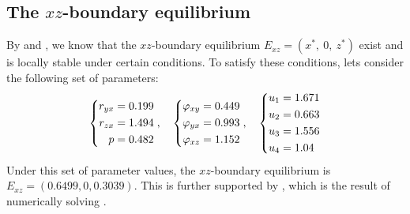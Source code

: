 \subsection{The $xz$-boundary equilibrium}\label{subsec:numsim_xz_boundary_equilibrium}
By  and , we know that the $xz$-boundary equilibrium $E_{xz}=\left(x^*,\ 0,\ z^*\right)$ exist and is locally stable under certain conditions. To satisfy these conditions, lets consider the following set of parameters:
\begin{equation}\label{params:boundary-xz}
    \begin{dcases}
        \begin{aligned}
            r_{yx} &= 0.199\\
            r_{zx} &= 1.494\\
            p &= 0.482
        \end{aligned}
    \end{dcases},\quad 
    \begin{dcases}
        \begin{aligned}
            \varphi_{xy} &= 0.449\\
            \varphi_{yx} &= 0.993\\
            \varphi_{xz} &= 1.152
        \end{aligned}
    \end{dcases},\quad
    \begin{dcases}
        \begin{aligned}
            u_1 &= 1.671\\
            u_2 &= 0.663\\
            u_3 &= 1.556\\
            u_4 &= 1.04
        \end{aligned}
    \end{dcases}
\end{equation}
Under this set of parameter values, the $xz$-boundary equilibrium is $E_{xz}=(0.6499,0,0.3039)$. This is further supported by , which is the result of numerically solving .


